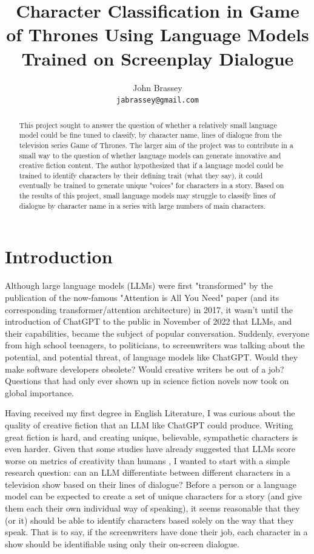 \documentclass[11pt]{article}
\title{Character Classification in Game of Thrones Using Language Models Trained on Screenplay Dialogue}
\author{John Brassey \\
  \texttt{jabrassey@gmail.com}
        }
\begin{document}
\maketitle
\begin{abstract}
This project sought to answer the question of whether a relatively small language model could be fine tuned to classify, by character name, lines of dialogue from the television series Game of Thrones. The larger aim of the project was to contribute in a small way to the question of whether language models can generate innovative and creative fiction content. The author hypothesized that if a language model could be trained to identify characters by their defining trait (what they say), it could eventually be trained to generate unique "voices" for characters in a story. Based on the results of this project, small language models may struggle to classify lines of dialogue by character name in a series with large numbers of main characters.
\end{abstract}

\section{Introduction}

Although large language models (LLMs) were first "transformed" by the publication of the now-famous "Attention is All You Need" paper \cite{vaswani2017attention} (and its corresponding transformer/attention architecture) in 2017, it wasn't until the introduction of ChatGPT to the public in November of 2022 that LLMs, and their capabilities,  became the subject of popular conversation. Suddenly, everyone from high school teenagers, to politicians, to screenwriters was talking about the potential, and potential threat, of language models like ChatGPT. Would they make software developers obsolete? Would creative writers be out of a job? Questions that had only ever shown up in science fiction novels now took on global importance.

Having received my first degree in English Literature, I was curious about the quality of creative fiction that an LLM like ChatGPT could produce. Writing great fiction is hard, and creating unique, believable, sympathetic characters is even harder. Given that some studies have already suggested that LLMs score worse on metrics of creativity than humans \cite{chakrabarty2023art}, I wanted to start with a simple research question: can an LLM differentiate between different characters in a television show based on their lines of dialogue? Before a person or a language model can be expected to create a set of unique characters for a story (and give them each their own individual way of speaking), it seems reasonable that they (or it) should be able to identify characters based solely on the way that they speak. That is to say, if the screenwriters have done their job, each character in a show should be identifiable using only their on-screen dialogue.
\end{document}
